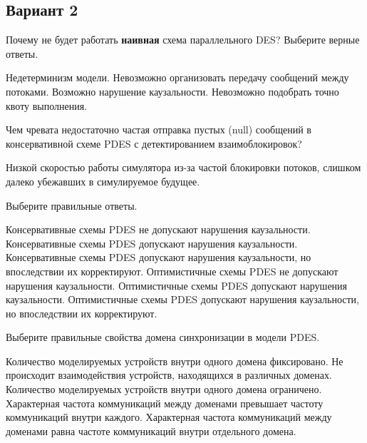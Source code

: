 \subsection*{Вариант 2}

\begin{questions}

\question[3] Почему не будет работать \textbf{наивная} схема параллельного DES? Выберите верные ответы.
\begin{choices}
    \correctchoice Недетерминизм модели.
    \choice Невозможно организовать передачу сообщений между потоками.
    \correctchoice Возможно нарушение каузальности.
    \choice Невозможно подобрать точно квоту выполнения.
\end{choices}

\question[3] Чем чревата недостаточно частая отправка пустых (null) сообщений в консервативной схеме PDES с детектированием взаимоблокировок?
\begin{solution}[1cm]
Низкой скоростью работы симулятора из-за частой блокировки потоков, слишком далеко убежавших в симулируемое будущее.
\end{solution}

\question[3] Выберите правильные ответы.
\begin{choices}
    \correctchoice Консервативные схемы PDES не допускают нарушения каузальности.
    \choice Консервативные схемы PDES допускают нарушения каузальности.
    \choice Консервативные схемы PDES допускают нарушения каузальности, но впоследствии их корректируют.
    \choice Оптимистичные схемы PDES не допускают нарушения каузальности.
    \choice Оптимистичные схемы PDES допускают нарушения каузальности.
    \correctchoice Оптимистичные схемы PDES допускают нарушения каузальности, но впоследствии их корректируют.
\end{choices}

\question[3] Выберите правильные свойства домена синхронизации в модели PDES.
\begin{choices}
    \choice Количество моделируемых устройств внутри одного домена фиксировано.
    \choice Не происходит взаимодействия устройств, находящихся в различных доменах.
    \choice Количество моделируемых устройств внутри одного домена ограничено.
    \correctchoice Характерная частота коммуникаций  между доменами превышает частоту коммуникаций внутри каждого.
    \choice Характерная частота коммуникаций  между доменами равна частоте коммуникаций внутри отдельного домена.
\end{choices}


\end{questions}


